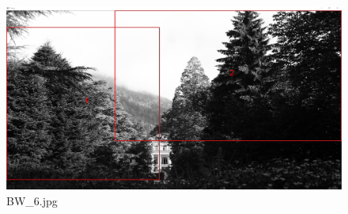 \documentclass{article}
\begin{document}
\begin{figure}[h]
\begin{center}
\includegraphics[width=1\textwidth]{images/trainb6}
\caption{\footnotesize{BW\_6.jpg}}
\label{img:trainb6}
\end{center}
\end{figure}
\end{document}
